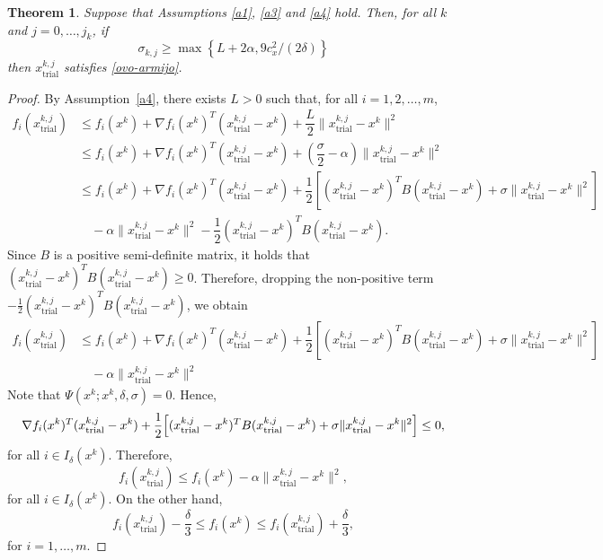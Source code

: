 \documentclass[11pt]{article}
\newcommand{\xkjtrial}{x^{k,j}_{\mathrm{trial}}}
\newtheorem{theorem}{Theorem}[section]
\begin{document}
\begin{theorem}
Suppose that Assumptions \ref{a1}, \ref{a3} and \ref{a4} hold. Then, for all $k$ and $j=0,\dots,j_k$, if 
\begin{equation}\label{este}
\sigma_{k,j} \geq \max \left\{ L + 2 \alpha, 9 c_x^2 / (2 \delta) \right\}
\end{equation}
then $\xkjtrial$ satisfies \eqref{ovo-armijo}.
\end{theorem}
\begin{proof}
By Assumption~\ref{a4}, there exists $L>0$ such that, for all $i=1,2,\dots,m$,
\begin{align*}
f_i(\xkjtrial) &\leq f_i(x^k) + \nabla f_i(x^k)^T(\xkjtrial-x^k)+\dfrac{L}{2}\|\xkjtrial - x^k\|^2\\
&\leq f_i(x^k) + \nabla f_i(x^k)^T(\xkjtrial-x^k)+\left(\dfrac{\sigma}{2}-\alpha\right)\|\xkjtrial - x^k\|^2\\
&\leq f_i(x^k) + \nabla f_i(x^k)^T(\xkjtrial-x^k)+\dfrac{1}{2}\left[(\xkjtrial-x^k)^TB(\xkjtrial-x^k) + \sigma\|\xkjtrial - x^k\|^2\right] \\
&\quad -\alpha\|\xkjtrial - x^k\|^2 - \dfrac{1}{2}(\xkjtrial-x^k)^TB(\xkjtrial-x^k).
\end{align*}
Since $B$ is a positive semi-definite matrix, it holds that $(\xkjtrial-x^k)^T B(\xkjtrial-x^k)\ge 0$. Therefore, dropping the non-positive term
$-\frac12(\xkjtrial-x^k)^T B(\xkjtrial-x^k)$, we obtain
\begin{align*}
f_i(\xkjtrial) &\leq f_i(x^k) + \nabla f_i(x^k)^T(\xkjtrial-x^k)+\dfrac{1}{2}\left[(\xkjtrial-x^k)^TB(\xkjtrial-x^k) + \sigma\|\xkjtrial - x^k\|^2\right] \\
&\quad - \alpha\|\xkjtrial - x^k\|^2
\end{align*}
Note that $\Psi(x^k; x^k,\delta,\sigma)=0$. Hence,
\[
\nabla f_i(x^k)^{T}(x_{\mathrm{trial}}^{k,j}-x^k)
+\frac12\Bigl[(x_{\mathrm{trial}}^{k,j}-x^k)^{T}B(x_{\mathrm{trial}}^{k,j}-x^k)
+\sigma\|x_{\mathrm{trial}}^{k,j}-x^k\|^2\Bigr]\le 0,
\]
for all $i\in I_\delta(x^k)$. Therefore, 
\begin{equation}\label{cota-lem2}
f_i(\xkjtrial) \leq f_i(x^k) - \alpha \|\xkjtrial - x^k\|^2,
\end{equation}
for all $i \in I_\delta(x^k)$. On the other hand, 
\begin{equation}\label{teo7eq1}
f_i(\xkjtrial) - \dfrac{\delta}{3}\le f_i(x^k)\le f_i(\xkjtrial) + \dfrac{\delta}{3},
\end{equation}
for $i=1,\dots,m$.
\end{proof}
\end{document}
